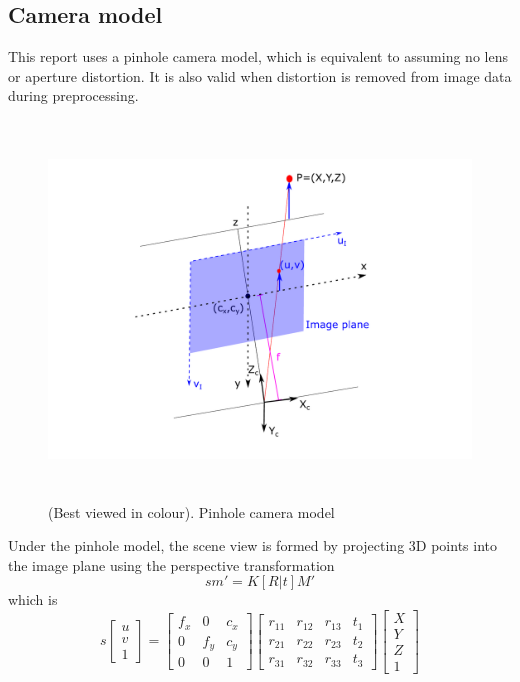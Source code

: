 \documentclass[12pt,a4paper]{article}
\begin{document}
  \subsection{Camera model}
    \label{ssec: BI camera model}
    This report uses a pinhole camera model, which is equivalent to assuming no lens or aperture distortion. It is also valid when distortion is removed from image data during preprocessing. 
    \begin{figure}[h]
    \centering
      \includegraphics[height=100mm, trim = 50mm 10mm 50mm 10mm, clip]{diags/pinhole.pdf}
    \caption{(Best viewed in colour). Pinhole camera model}
    \label{fig: pinhole}
    \end{figure}
    Under the pinhole model, the scene view is formed by projecting 3D points into the image plane using the perspective transformation \cite{OpenCV-3d-reconstruction}
    \[
    sm' = K[R|t] M'
    \]
    which is
    \[
    s \begin{bmatrix} u \\ v \\ 1 \end{bmatrix} = \begin{bmatrix} f_x & 0 & c_x \\ 0 & f_y & c_y \\ 0 & 0 & 1 \end{bmatrix} \begin{bmatrix} r_{11} & r_{12} & r_{13} & t_1 \\ r_{21} & r_{22} & r_{23} & t_2 \\ r_{31} & r_{32} & r_{33} & t_3 \end{bmatrix} \begin{bmatrix} X \\ Y \\ Z \\ 1 \end{bmatrix}
    \]
\end{document}
